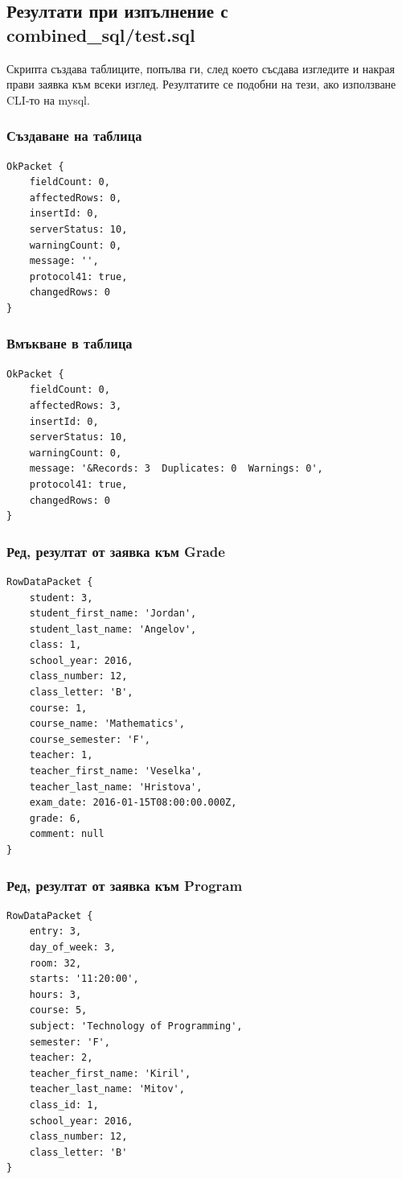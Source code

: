\documentclass[a4paper, 12pt, x11names]{article}
\begin{document}
\subsection{Резултати при изпълнение с combined\_sql/test.sql}
Скрипта създава таблиците, попълва ги, след което съсдава изгледите и накрая прави заявка към всеки изглед.
Резултатите се подобни на тези, ако използване CLI-то на mysql.
\subsubsection{Създаване на таблица}
\begin{listing}
\begin{verbatim}
OkPacket {
    fieldCount: 0,
    affectedRows: 0,
    insertId: 0,
    serverStatus: 10,
    warningCount: 0,
    message: '',
    protocol41: true,
    changedRows: 0
}
\end{verbatim}
\end{listing}
\subsubsection{Вмъкване в таблица}
\begin{listing}
\begin{verbatim}
OkPacket {
    fieldCount: 0,
    affectedRows: 3,
    insertId: 0,
    serverStatus: 10,
    warningCount: 0,
    message: '&Records: 3  Duplicates: 0  Warnings: 0',
    protocol41: true,
    changedRows: 0
}
\end{verbatim}
\end{listing}
\subsubsection{Ред, резултат от заявка към Grade}
\begin{listing}
\begin{verbatim}
RowDataPacket {
    student: 3,
    student_first_name: 'Jordan',
    student_last_name: 'Angelov',
    class: 1,
    school_year: 2016,
    class_number: 12,
    class_letter: 'B',
    course: 1,
    course_name: 'Mathematics',
    course_semester: 'F',
    teacher: 1,
    teacher_first_name: 'Veselka',
    teacher_last_name: 'Hristova',
    exam_date: 2016-01-15T08:00:00.000Z,
    grade: 6,
    comment: null
}
\end{verbatim}
\end{listing}
\subsubsection{Ред, резултат от заявка към Program}
\begin{listing}
\begin{verbatim}
RowDataPacket {
    entry: 3,
    day_of_week: 3,
    room: 32,
    starts: '11:20:00',
    hours: 3,
    course: 5,
    subject: 'Technology of Programming',
    semester: 'F',
    teacher: 2,
    teacher_first_name: 'Kiril',
    teacher_last_name: 'Mitov',
    class_id: 1,
    school_year: 2016,
    class_number: 12,
    class_letter: 'B'
}
\end{verbatim}
\end{listing}
\end{document}
